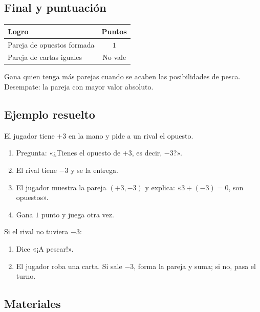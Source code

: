 \documentclass[12pt, letterpaper]{article}
\begin{document}
\subsection{Final y puntuación}

\begin{center}
\small
\begin{tabular}{@{}p{8.2cm} c@{}}
\toprule
\textbf{Logro} & \textbf{Puntos}\\
\midrule
Pareja de opuestos formada & $1$\\
Pareja de cartas iguales & No vale\\
\bottomrule
\end{tabular}
\end{center}

Gana quien tenga más parejas cuando se acaben las posibilidades de pesca. Desempate: la pareja con mayor valor absoluto.

\subsection{Ejemplo resuelto}

El jugador tiene $+3$ en la mano y pide a un rival el opuesto.

\begin{cuadrosolucion}
\begin{enumerate}[leftmargin=*]
  \item Pregunta: «¿Tienes el opuesto de $+3$, es decir, $-3$?».
  \item El rival tiene $-3$ y se la entrega.
  \item El jugador muestra la pareja $(+3,-3)$ y explica: «$3+(-3)=0$, son opuestos».
  \item Gana $1$ punto y juega otra vez.
\end{enumerate}
Si el rival no tuviera $-3$:
\begin{enumerate}[leftmargin=*]
  \item Dice «¡A pescar!».
  \item El jugador roba una carta. Si sale $-3$, forma la pareja y suma; si no, pasa el turno.
\end{enumerate}
\end{cuadrosolucion}

\subsection{Materiales}
\end{document}
